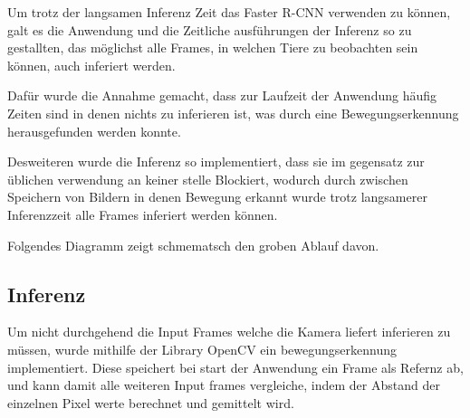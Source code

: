 Um trotz der langsamen Inferenz Zeit das Faster R-CNN 
verwenden zu können, galt es die Anwendung und die 
Zeitliche ausführungen der Inferenz so zu gestallten, 
das möglichst alle Frames, in welchen Tiere zu beobachten 
sein können, auch inferiert werden.

Dafür wurde die Annahme gemacht, dass zur Laufzeit der 
Anwendung häufig Zeiten sind in denen nichts zu inferieren 
ist, was durch eine Bewegungserkennung herausgefunden werden 
konnte.

Desweiteren wurde die Inferenz so implementiert, dass sie 
im gegensatz zur üblichen verwendung an keiner stelle Blockiert, 
wodurch durch zwischen Speichern von Bildern in denen 
Bewegung erkannt wurde trotz langsamerer Inferenzzeit alle 
Frames inferiert werden können.

Folgendes Diagramm zeigt schmematsch den groben Ablauf davon.

\vspace{1cm}

\centering


\newpage
% 

%         
%     
%     


%








\subsection*{Inferenz}


Um nicht durchgehend die Input Frames welche die Kamera liefert inferieren zu 
müssen, wurde mithilfe der Library OpenCV ein bewegungserkennung 
implementiert. Diese speichert bei start der Anwendung ein Frame 
als Refernz ab, und kann damit alle weiteren Input frames vergleiche, 
indem der Abstand der einzelnen Pixel werte berechnet und gemittelt wird.

